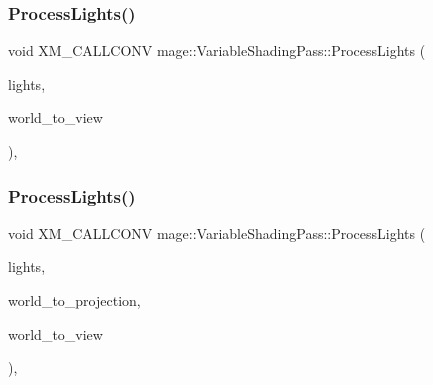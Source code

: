 \hypertarget{classmage_1_1_variable_shading_pass_a757ad7a8aa305319ebb8a985acfa81b5}{}\label{classmage_1_1_variable_shading_pass_a757ad7a8aa305319ebb8a985acfa81b5} 
\subsubsection{\texorpdfstring{Process\+Lights()}{ProcessLights()}\hspace{0.1cm}{\footnotesize\ttfamily [1/3]}}
{\footnotesize\ttfamily void X\+M\+\_\+\+C\+A\+L\+L\+C\+O\+NV mage\+::\+Variable\+Shading\+Pass\+::\+Process\+Lights (\begin{DoxyParamCaption}\item[{const vector$<$ const \hyperlink{namespacemage_a7637b5351fc0f66a10badd80ebb35899}{Directional\+Light\+Node} $\ast$ $>$ \&}]{lights,  }\item[{F\+X\+M\+M\+A\+T\+R\+IX}]{world\+\_\+to\+\_\+view }\end{DoxyParamCaption})\hspace{0.3cm}{\ttfamily [private]}, {\ttfamily [noexcept]}}

\hypertarget{classmage_1_1_variable_shading_pass_ad4a1cef19ec60875df40483f94b50e71}{}\label{classmage_1_1_variable_shading_pass_ad4a1cef19ec60875df40483f94b50e71} 
\subsubsection{\texorpdfstring{Process\+Lights()}{ProcessLights()}\hspace{0.1cm}{\footnotesize\ttfamily [2/3]}}
{\footnotesize\ttfamily void X\+M\+\_\+\+C\+A\+L\+L\+C\+O\+NV mage\+::\+Variable\+Shading\+Pass\+::\+Process\+Lights (\begin{DoxyParamCaption}\item[{const vector$<$ const \hyperlink{namespacemage_a1724c6e6b6b5ba535cdd967cbbb4a669}{Omni\+Light\+Node} $\ast$ $>$ \&}]{lights,  }\item[{F\+X\+M\+M\+A\+T\+R\+IX}]{world\+\_\+to\+\_\+projection,  }\item[{F\+X\+M\+M\+A\+T\+R\+IX}]{world\+\_\+to\+\_\+view }\end{DoxyParamCaption})\hspace{0.3cm}{\ttfamily [private]}, {\ttfamily [noexcept]}}

